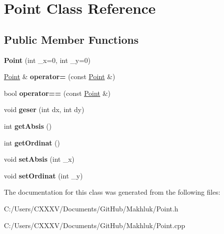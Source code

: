 \hypertarget{class_point}{}\section{Point Class Reference}
\label{class_point}
\subsection*{Public Member Functions}
\begin{DoxyCompactItemize}
\item 
{\bfseries Point} (int \+\_\+x=0, int \+\_\+y=0)\hypertarget{class_point_adbd2637ceed85e28315d96c8208154a5}{}\label{class_point_adbd2637ceed85e28315d96c8208154a5}

\item 
\hyperlink{class_point}{Point} \& {\bfseries operator=} (const \hyperlink{class_point}{Point} \&)\hypertarget{class_point_a55eeab949e62268da63176d48570eb54}{}\label{class_point_a55eeab949e62268da63176d48570eb54}

\item 
bool {\bfseries operator==} (const \hyperlink{class_point}{Point} \&)\hypertarget{class_point_a9201e61e7884cb0f861f09639cb1c121}{}\label{class_point_a9201e61e7884cb0f861f09639cb1c121}

\item 
void {\bfseries geser} (int dx, int dy)\hypertarget{class_point_ad2432ee1f003f107b898243a1285a14b}{}\label{class_point_ad2432ee1f003f107b898243a1285a14b}

\item 
int {\bfseries get\+Absis} ()\hypertarget{class_point_ae33b5d39a797830928a7d38376b23d21}{}\label{class_point_ae33b5d39a797830928a7d38376b23d21}

\item 
int {\bfseries get\+Ordinat} ()\hypertarget{class_point_a23af70007db8db0ac9f74d1eafecdadc}{}\label{class_point_a23af70007db8db0ac9f74d1eafecdadc}

\item 
void {\bfseries set\+Absis} (int \+\_\+x)\hypertarget{class_point_add1782a8109328ad174a8bc829621011}{}\label{class_point_add1782a8109328ad174a8bc829621011}

\item 
void {\bfseries set\+Ordinat} (int \+\_\+y)\hypertarget{class_point_adcb07a7e64713bc497e5174b5bec6a10}{}\label{class_point_adcb07a7e64713bc497e5174b5bec6a10}

\end{DoxyCompactItemize}


The documentation for this class was generated from the following files\+:\begin{DoxyCompactItemize}
\item 
C\+:/\+Users/\+C\+X\+X\+X\+V/\+Documents/\+Git\+Hub/\+Makhluk/Point.\+h\item 
C\+:/\+Users/\+C\+X\+X\+X\+V/\+Documents/\+Git\+Hub/\+Makhluk/Point.\+cpp\end{DoxyCompactItemize}
